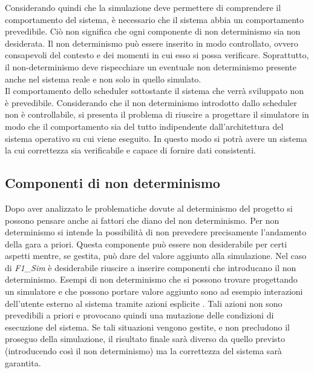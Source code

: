 Considerando quindi che la simulazione deve permettere di comprendere il
comportamento del sistema, è necessario che il sistema abbia 
un comportamento prevedibile. Ciò non significa che ogni componente di non
determinismo sia non desiderata. Il non determinismo
può essere inserito in modo controllato, ovvero consapevoli del contesto e dei
momenti in cui esso si possa verificare. Soprattutto,
il non-determinismo deve rispecchiare un eventuale non determinismo presente
anche nel sistema reale e non solo in quello simulato.\\
Il comportamento dello scheduler sottostante il sistema che verrà sviluppato non
è prevedibile. Considerando che il non determinismo
introdotto dallo scheduler non è controllabile, si presenta
il problema di riuscire a progettare il simulatore in modo
che il comportamento sia del tutto indipendente dall'architettura del sistema
operativo su cui viene eseguito. In questo
modo si potrà avere un sistema la cui correttezza sia verificabile e capace di
fornire dati consistenti.
\subsection{Componenti di non determinismo }
\label{non_determinismo}
Dopo aver analizzato le problematiche dovute al determinismo del progetto si
possono pensare anche ai fattori che diano del non determinismo.
Per non determinismo si intende la possibilit\`{a} di non prevedere precisamente
l'andamento della gara a priori. Questa componente pu\`{o} essere non
desiderabile per certi aspetti mentre, se gestita, pu\`{o} dare del valore
aggiunto alla simulazione. Nel caso di \emph{F1\_Sim} \`{e} desiderabile
riuscire a inserire componenti che introducano il non determinismo.
Esempi di non determinismo che si possono trovare progettando un simulatore e
che possono portare valore aggiunto sono ad esempio interazioni dell'utente
esterno al sistema tramite azioni esplicite . Tali azioni non sono prevedibili
a priori e provocano quindi una mutazione delle condizioni di esecuzione del 
sistema. Se tali situazioni vengono gestite, e non precludono il proseguo
della simulazione, il risultato finale sarà diverso da quello previsto (introducendo
così il non determinismo) ma la correttezza del sistema sarà garantita.
